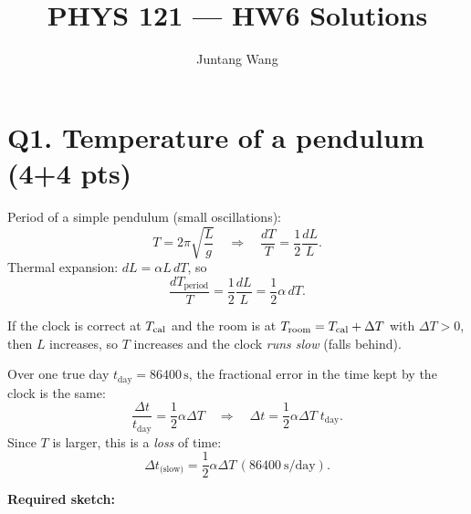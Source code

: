 \documentclass[11pt]{article}
\title{PHYS 121 --- HW6 Solutions}
\author{Juntang Wang}
\newcommand{\ans}[1]{\boxed{\displaystyle #1}}
\begin{document}
\maketitle
{}

\section*{Q1. Temperature of a pendulum (4+4 pts)}

Period of a simple pendulum (small oscillations):
\[
T = 2\pi\sqrt{\frac{L}{g}} \quad\Rightarrow\quad
\frac{dT}{T} = \frac{1}{2}\frac{dL}{L}.
\]
Thermal expansion: \(dL = \alpha L\,dT\), so
\[
\frac{dT_{\text{period}}}{T}
 = \frac{1}{2}\frac{dL}{L}
 = \frac{1}{2}\alpha\,dT.
\]

If the clock is correct at \(T_{\rm cal}\) and the room is at
\(T_{\rm room}=T_{\rm cal}+\Delta T\) with \(\Delta T>0\),
then \(L\) increases, so \(T\) increases and the clock \emph{runs slow}
(falls behind).

Over one true day \(t_{\text{day}}=86400\,\text{s}\), the fractional
error in the time kept by the clock is the same:
\[
\frac{\Delta t}{t_{\text{day}}}
 = \frac{1}{2}\alpha\Delta T
 \quad\Rightarrow\quad
\Delta t = \frac{1}{2}\alpha\Delta T\;t_{\text{day}}.
\]
Since \(T\) is larger, this is a \emph{loss} of time:
\[
\ans{\Delta t_{\text{(slow)}} =
 \frac{1}{2}\alpha\Delta T\,(86400\ \text{s/day})}.
\]

\bigskip
\noindent\textbf{Required sketch:}
\begin{center}
  \end{center}
\end{document}
